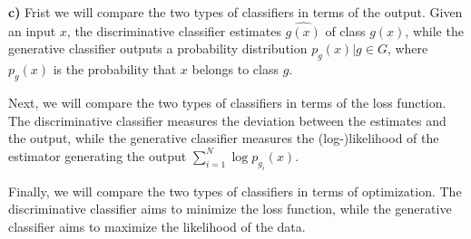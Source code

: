 \documentclass{article}
\begin{document}
\textbf{c)} Frist we will compare the two types of classifiers in terms of the output. Given an input $x$, the discriminative classifier estimates $\hat{g(x)}$ of class $g(x)$, while the generative classifier outputs a probability distribution ${p_g(x) | g \in G}$, where $p_g(x)$ is the probability that $x$ belongs to class $g$.

Next, we will compare the two types of classifiers in terms of the loss function. The discriminative classifier measures the deviation between the estimates and the output, while the generative classifier measures the (log-)likelihood of the estimator generating the output $\sum_{i=1}^{N} \log p_{g_i}(x)$.

Finally, we will compare the two types of classifiers in terms of optimization. The discriminative classifier aims to minimize the loss function, while the generative classifier aims to maximize the likelihood of the data.

\clearpage

% 
% 

\end{document}
